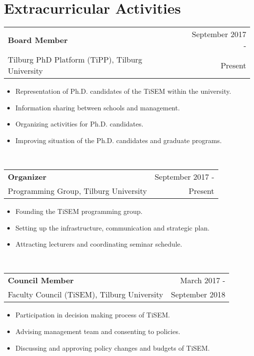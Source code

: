 \documentclass[a4paper,12pt]{article}
\begin{document}
\section{Extracurricular Activities }

\begin{tabular}{p{12cm}r}
	\textbf{Board Member}  &September 2017 -\\
	Tilburg PhD Platform (TiPP), {Tilburg University} & Present\phantom{ -}\\
\end{tabular}
\begin{itemize}[noitemsep]
	\item Representation of Ph.D. candidates of the TiSEM within the university.
	\item Information sharing between schools and management.
	\item Organizing activities for Ph.D. candidates.
	\item Improving situation of the Ph.D. candidates and graduate programs.
\end{itemize}\vspace{1em}\\

\begin{tabular}{p{12cm}r}
\textbf{Organizer}  &September 2017 -\\
Programming Group, {Tilburg University} & Present\phantom{ -}\\
\end{tabular}
\begin{itemize}[noitemsep]
	\item Founding the TiSEM programming group.
	\item Setting up the infrastructure, communication and strategic plan.
	\item Attracting lecturers and coordinating seminar schedule.
\end{itemize}\vspace{1em}\\

\begin{tabular}{p{12cm}r}
\textbf{Council Member}  &March 2017 -\\
Faculty Council (TiSEM), {Tilburg University} & September 2018\phantom{ -}\\
\end{tabular}
\begin{itemize}[noitemsep]
	\item Participation in decision making process of TiSEM.
	\item Advising management team and consenting to policies.
	\item Discussing and approving policy changes and budgets of TiSEM.
\end{itemize}\vspace{1em}\\
\end{document}
